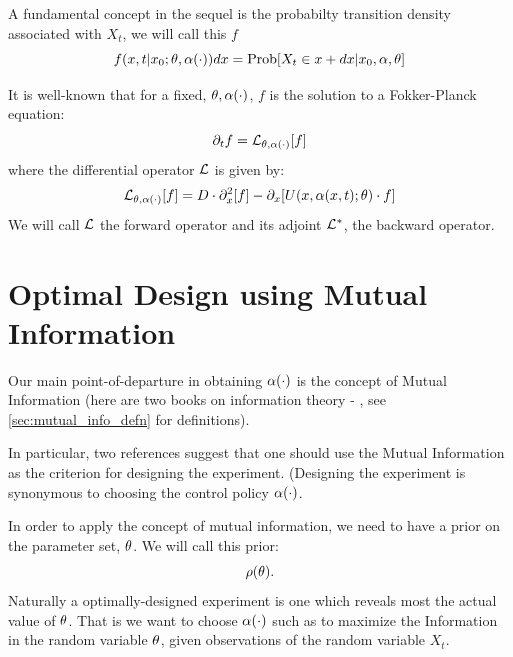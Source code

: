 \documentclass{article}
\begin{document}
A fundamental concept in the sequel is the probabilty transition density
associated with $X_t$, we will call this $f$
\begin{equation}
f(x,t| x_0 ;{\theta}, {\alpha}(\cdot)) dx = \operatorname{Prob}[ X_t \in x + dx | x_0, {\alpha}, {\theta}]
\end{equation} 

It is well-known that for a fixed, ${\theta}, {\alpha}(\cdot)$, $f$ is the solution to a
Fokker-Planck equation:
\begin{equation}
{\partial}_t f = { \mathcal{L} }_{{\theta}, {\alpha}(\cdot)}[f]
\label{eq:fokker_planck_forward_density}
\end{equation}
where the differential operator ${ \mathcal{L} }$ is given by:
$$
{ \mathcal{L} }_{{\theta}, {\alpha}(\cdot)}[f] = D \cdot {\partial}_x^2 [f] - {\partial}_x[U(x,{\alpha}(x,t); {\theta}) \cdot f]
$$
We will call ${ \mathcal{L} }$ the forward operator and its adjoint ${ { \mathcal{L} }^* }$, the backward
operator.


\section{Optimal Design using Mutual Information}
Our main point-of-departure in obtaining ${\alpha}(\cdot)$ is the concept of Mutual
Information (here are two books on information theory -
\cite{Cover2006,MacKay2003}, see \cref{sec:mutual_info_defn} for definitions).

In particular, two references suggest that one should use the Mutual
Information \cite{Myung2013,Lewi2009} as the criterion for designing the
experiment. (Designing the experiment is synonymous to choosing the control policy
${\alpha}(\cdot)$.

In order to apply the concept of mutual information, we need to have a prior on
the parameter set, ${\theta}$. We will call this prior: 
$$\rho({\theta}).$$ 
Naturally a optimally-designed experiment is one which reveals most the actual
value of ${\theta}$. That is we want to choose ${\alpha}(\cdot)$ such as to maximize the
Information in the random variable ${\theta}$, given observations of the random
variable $X_t$.
\end{document}
